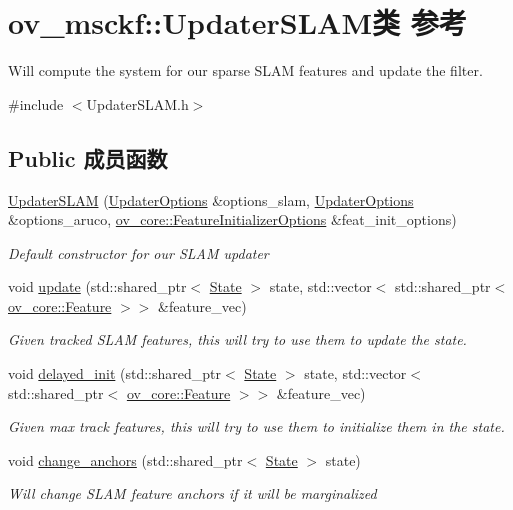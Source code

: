 \hypertarget{classov__msckf_1_1UpdaterSLAM}{}\section{ov\+\_\+msckf\+:\+:Updater\+S\+L\+A\+M类 参考}
\label{classov__msckf_1_1UpdaterSLAM}


Will compute the system for our sparse S\+L\+AM features and update the filter.  




{\ttfamily \#include $<$Updater\+S\+L\+A\+M.\+h$>$}

\subsection*{Public 成员函数}
\begin{DoxyCompactItemize}
\item 
\hyperlink{classov__msckf_1_1UpdaterSLAM_a24185ab7a42cea66b9361ebf991e9548}{Updater\+S\+L\+AM} (\hyperlink{structov__msckf_1_1UpdaterOptions}{Updater\+Options} \&options\+\_\+slam, \hyperlink{structov__msckf_1_1UpdaterOptions}{Updater\+Options} \&options\+\_\+aruco, \hyperlink{structov__core_1_1FeatureInitializerOptions}{ov\+\_\+core\+::\+Feature\+Initializer\+Options} \&feat\+\_\+init\+\_\+options)
\begin{DoxyCompactList}\small\item\em Default constructor for our S\+L\+AM updater \end{DoxyCompactList}\item 
void \hyperlink{classov__msckf_1_1UpdaterSLAM_a327bcedfea68fe301dc37e1f08d562e6}{update} (std\+::shared\+\_\+ptr$<$ \hyperlink{classov__msckf_1_1State}{State} $>$ state, std\+::vector$<$ std\+::shared\+\_\+ptr$<$ \hyperlink{classov__core_1_1Feature}{ov\+\_\+core\+::\+Feature} $>$$>$ \&feature\+\_\+vec)
\begin{DoxyCompactList}\small\item\em Given tracked S\+L\+AM features, this will try to use them to update the state. \end{DoxyCompactList}\item 
void \hyperlink{classov__msckf_1_1UpdaterSLAM_a4ef14978d06b4386672fe56c3a844fda}{delayed\+\_\+init} (std\+::shared\+\_\+ptr$<$ \hyperlink{classov__msckf_1_1State}{State} $>$ state, std\+::vector$<$ std\+::shared\+\_\+ptr$<$ \hyperlink{classov__core_1_1Feature}{ov\+\_\+core\+::\+Feature} $>$$>$ \&feature\+\_\+vec)
\begin{DoxyCompactList}\small\item\em Given max track features, this will try to use them to initialize them in the state. \end{DoxyCompactList}\item 
void \hyperlink{classov__msckf_1_1UpdaterSLAM_ae85d162f1a93f1dbed1a60b2fdd26870}{change\+\_\+anchors} (std\+::shared\+\_\+ptr$<$ \hyperlink{classov__msckf_1_1State}{State} $>$ state)
\begin{DoxyCompactList}\small\item\em Will change S\+L\+AM feature anchors if it will be marginalized \end{DoxyCompactList}\end{DoxyCompactItemize}
